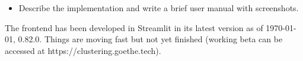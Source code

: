 \begin{itemize}
\item Describe the implementation and write a brief user manual with screenshots.
\end{itemize}

The frontend has been developed in Streamlit \cite{streamlit2018} in its latest version as of \today, 0.82.0. Things are moving fast but not yet finished (working beta can be accessed at https://clustering.goethe.tech).